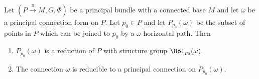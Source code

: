 \begin{thm}\label{prop 1.7.12 RS2}
    Let $(P\overset{\pi}{\to}M,G,\Phi)$ be a principal bundle with a connected base $M$ and let $\omega$ be a principal connection form on $P$. Let $p_0\in P$ and let $P_{p_0}(\omega)$ be the subset of points in $P$ which can be joined to $p_0$ by a $\omega$-horizontal path. Then
    \begin{enumerate}
        \item $P_{p_0}(\omega)$ is a reduction of $P$ with structure group $\Hol_{p_0}(\omega)$.
        \item The connection $\omega$ is reducible to a principal connection on $P_{p_0}(\omega)$.
    \end{enumerate}
\end{thm}
